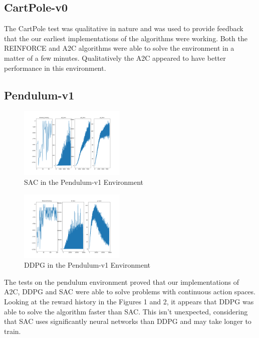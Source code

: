 \documentclass[conference]{IEEEtran}
\begin{document}
\subsection{CartPole-v0}

The CartPole test was qualitative in nature and was used to provide feedback that the our earliest implementations of the algorithms were working. Both the REINFORCE and A2C algorithms were able to solve the environment in a matter of a few minutes. Qualitatively the A2C appeared to have better performance in this environment.

\subsection{Pendulum-v1}

\begin{figure}
    \includegraphics[width=0.45\textwidth]{sac-pendulum}
    \caption{SAC in the Pendulum-v1 Environment}
\end{figure}

\begin{figure}
    \includegraphics[width=0.45\textwidth]{ddpg-pendulum}
    \caption{DDPG in the Pendulum-v1 Environment}
\end{figure}

The tests on the pendulum environment proved that our implementations of A2C, DDPG and SAC were able to solve problems with continuous action spaces. Looking at the reward history in the Figures 1 and 2, it appears that DDPG was able to solve the algorithm faster than SAC. This isn't unexpected, considering that SAC uses significantly neural networks than DDPG and may take longer to train.
\end{document}
